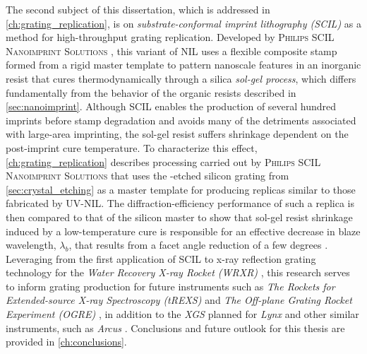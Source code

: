The second subject of this dissertation, which is addressed in \cref{ch:grating_replication}, is on \emph{substrate-conformal imprint lithography (SCIL)} \cite{Verschuuren10,Verschuuren17} as a method for high-throughput grating replication. 
Developed by \textsc{Philips SCIL Nanoimprint Solutions} \cite{philis_scil}, this variant of NIL uses a flexible composite stamp formed from a rigid master template to pattern nanoscale features in an inorganic resist that cures thermodynamically through a silica \emph{sol-gel process}, which differs fundamentally from the behavior of the organic resists described in \cref{sec:nanoimprint}. %
Although SCIL enables the production of several hundred imprints before stamp degradation and avoids many of the detriments associated with large-area imprinting, the sol-gel resist suffers shrinkage dependent on the post-imprint cure temperature.  
To characterize this effect, \cref{ch:grating_replication} describes processing carried out by \textsc{Philips SCIL Nanoimprint Solutions} that uses the -etched silicon grating from \cref{sec:crystal_etching} as a master template for producing replicas similar to those fabricated by UV-NIL. 
The diffraction-efficiency performance of such a replica is then compared to that of the silicon master to show that sol-gel resist shrinkage induced by a low-temperature cure is responsible for an effective decrease in blaze wavelength, $\lambda_b$, that results from a facet angle reduction of a few degrees \cite{McCoy20b}. 
Leveraging from the first application of SCIL to x-ray reflection grating technology for the \emph{Water Recovery X-ray Rocket (WRXR)} \cite{Miles17,Miles18b,Miles19,Verschuuren18,Tutt19}, this research serves to inform grating production for future instruments such as \emph{The Rockets for Extended-source X-ray Spectroscopy (tREXS)} \cite{Miles19b,Tutt19b} and \emph{The Off-plane Grating Rocket Experiment (OGRE)} \cite{DeRoo13,McEntaffer14,DeRoo16thesis,Donovan18b,Tutt18,Donovan19a,Donovan19b}, in addition to the \emph{XGS} planned for \emph{Lynx} \cite{McEntaffer19} and other similar instruments, such as \emph{Arcus} \cite{Smith19_arcus,Arcus_web}. 
Conclusions and future outlook for this thesis are provided in \cref{ch:conclusions}.

